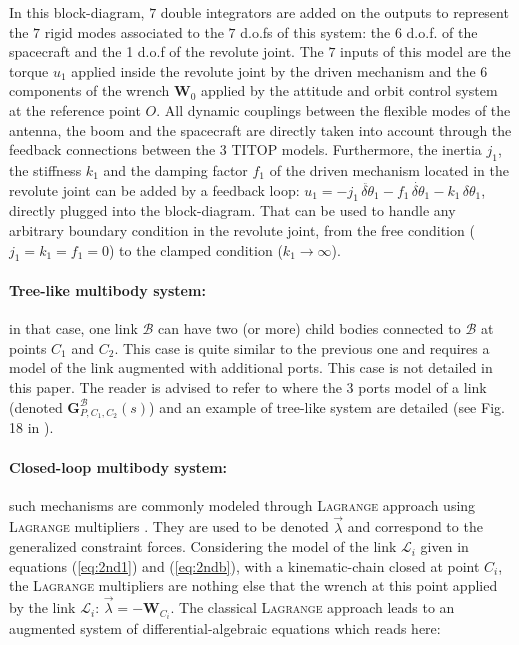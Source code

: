\documentclass[smallcondensed]{svjour3}     %
\begin{document}
In this block-diagram, $7$ double integrators are added on the outputs to represent the $7$ rigid modes associated to the $7$ d.o.fs of this system: the 6 d.o.f. of the spacecraft and the 1 d.o.f of the revolute joint. The $7$ inputs of this model are the torque $u_1$ applied inside the revolute joint by the driven mechanism and the $6$ components of the wrench $\mathbf{W}_0$ applied by the attitude and orbit control system at the reference point $O$. All dynamic couplings between the flexible modes of the antenna, the boom and the spacecraft are directly taken into account through the feedback connections between the 3 TITOP models. Furthermore, the inertia $j_1$, the stiffness $k_1$ and the damping factor $f_1$ of the driven mechanism located in the revolute joint can be added by a feedback loop: $u_1=-j_1\,\ddot{\delta \theta}_1-f_1\,\dot{\delta \theta}_1-k_1\,\delta \theta_1$, directly plugged into the block-diagram. That can be used to handle any arbitrary boundary condition in the revolute joint, from the free condition ($j_1=k_1=f_1=0$) to the clamped condition ($k_1\to \infty$).

\paragraph{Tree-like multibody system:}
in that case, one link $\mathcal{B}$ can have two (or more) child bodies connected to  $\mathcal{B}$ at points $C_1$ and $C_2$. This case is quite similar to the previous one and requires a model of the link  augmented with additional ports. This case is not detailed in this paper. The reader is advised to refer to \cite{Alazard2015} where the 3 ports model of a link (denoted $\mathbf{G}_{P,C_1,C_2}^{\mathcal{B}}(s)$) and an example of tree-like system are detailed (see Fig. 18 in \cite{Alazard2015}).

\paragraph{Closed-loop multibody system:} such mechanisms are commonly modeled through \textsc{Lagrange} approach using \textsc{Lagrange} multipliers \cite{ShabanaMSD1997,Simeon2006}. They are used to be denoted $\vec{\lambda}$ and correspond to the generalized constraint forces. Considering the model of the link $\mathcal{L}_i$ given in equations (\ref{eq:2nd1}) and (\ref{eq:2ndb}), with a kinematic-chain closed at point $C_i$, the \textsc{Lagrange} multipliers are nothing else that the wrench at this point applied by the link $\mathcal{L}_i$: $\vec{\lambda}=-\mathbf{W}_{C_i}$. The classical \textsc{Lagrange} approach leads to an augmented system of differential-algebraic equations which reads here:
\end{document}
